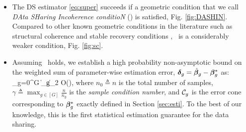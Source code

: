 \begin{itemize}[leftmargin = .4cm]
	\item The DS estimator \eqref{eq:super} succeeds if a geometric condition that we call \emph{DAta SHaring Incoherence conditioN} (\ds) is satisfied, Fig. \ref{fig:DASHIN}. Compared to other known geometric conditions in the literature such as structural coherence \cite{guba16} and stable recovery conditions \cite{mctr13}, \ds\ is a considerably weaker condition, Fig. \ref{fig:sc}.
	\item Assuming \ds\ holds, we establish a high probability non-asymptotic bound on the weighted sum of parameter-wise estimation error, $\boldsymbol{\delta}_g = \hat{\boldsymbol{\beta}}_g - \boldsymbol{\beta}_g^*$ as:
	\beq
	\label{eq:errorsum}
	\sum_{g=0}^{G}   \|\ddelta_g\|_2 \leq  \gamma O\left(\right),
	\eeq
	where $n_0 \triangleq n$ is the total number of samples, $\gamma \triangleq \max_{g \in [G] } \frac{n}{n_g}$ is the \emph{sample condition number}, and $\cC_g$ is the error cone corresponding to $\boldsymbol{\beta}_g^*$ exactly defined in Section \ref{sec:esti}.
	To the best of our knowledge, this is the first statistical estimation guarantee for the data sharing.%
	

\end{itemize}
